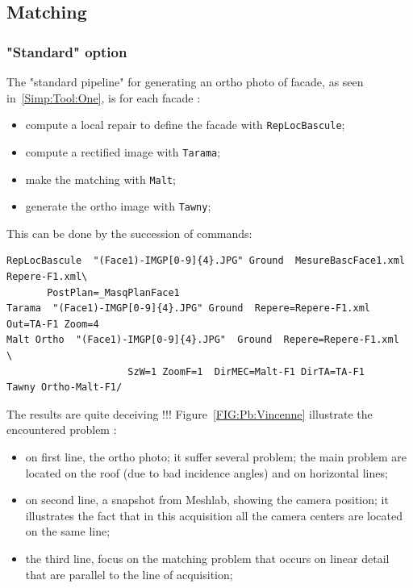 \subsection{Matching}


\subsubsection{"Standard" option}

The "standard pipeline" for generating an ortho photo of facade,
as seen in~\ref{Simp:Tool:One}, is for each facade :

\begin{itemize}
   \item compute a local repair to define the facade with {\tt RepLocBascule};
   \item compute a rectified image with {\tt Tarama};
   \item make the matching with {\tt Malt};
   \item generate the ortho image with {\tt  Tawny};
\end{itemize}

This can be done by the succession of commands:

\begin{verbatim}
RepLocBascule  "(Face1)-IMGP[0-9]{4}.JPG" Ground  MesureBascFace1.xml Repere-F1.xml\
       PostPlan=_MasqPlanFace1
Tarama  "(Face1)-IMGP[0-9]{4}.JPG" Ground  Repere=Repere-F1.xml  Out=TA-F1 Zoom=4
Malt Ortho  "(Face1)-IMGP[0-9]{4}.JPG"  Ground  Repere=Repere-F1.xml  \
                     SzW=1 ZoomF=1  DirMEC=Malt-F1 DirTA=TA-F1
Tawny Ortho-Malt-F1/
\end{verbatim}

The results are quite deceiving !!! Figure~\ref{FIG:Pb:Vincenne} illustrate the
encountered problem :

\begin{itemize}
    \item on first line, the ortho photo; it suffer several problem; the main problem
         are located on the roof (due to bad incidence angles) and on horizontal lines;

    \item on second line, a snapshot from Meshlab, showing the camera position;
          it illustrates the fact that in this acquisition all the camera centers are
         located on the same line;

    \item the third line, focus on the matching problem  that occurs on linear detail that
          are parallel to the line of acquisition;
\end{itemize}


